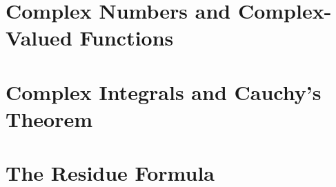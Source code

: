 \documentclass{report}
\begin{document}
	
	\thispagestyle{empty}
	\newpage%
	\tableofcontents
  
  \chapter{Complex Numbers and Complex-Valued Functions}
  
  \chapter{Complex Integrals and Cauchy's Theorem}
  
  \chapter{The Residue Formula}
  
  
\end{document}
